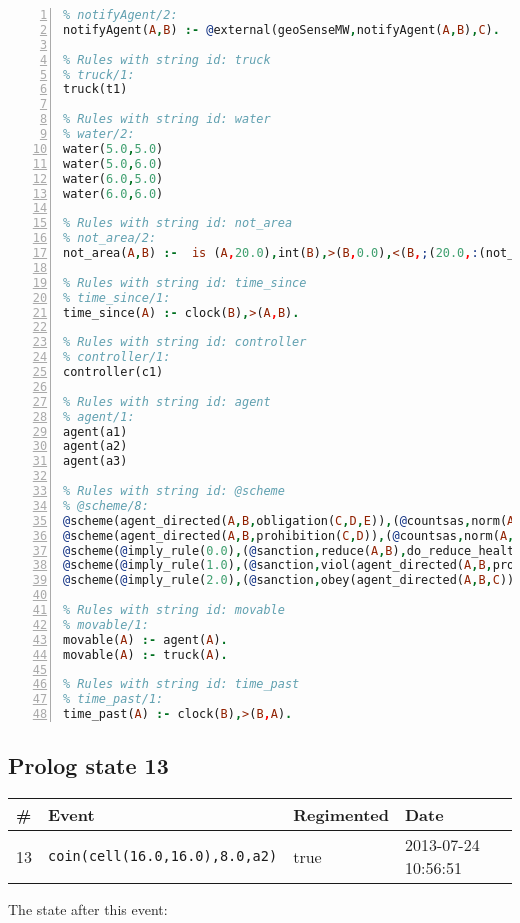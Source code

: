 \documentclass[11pt]{article}\usepackage[utf8]{inputenc}\usepackage{geometry}
\begin{document}
\begin{lstlisting}[language=Prolog, numbers=left]
% Rules with string id: notifyAgent
% notifyAgent/2:
notifyAgent(A,B) :- @external(geoSenseMW,notifyAgent(A,B),C).

% Rules with string id: truck
% truck/1:
truck(t1)

% Rules with string id: water
% water/2:
water(5.0,5.0)
water(5.0,6.0)
water(6.0,5.0)
water(6.0,6.0)

% Rules with string id: not_area
% not_area/2:
not_area(A,B) :-  is (A,20.0),int(B),>(B,0.0),<(B,;(20.0,:(not_area(A,B), is (-(B),20.0)))),int(A),>(A,0.0),<(A,;(20.0,:(area(A,B),-(int(A))))),int(B),>(A,0.0),>(B,0.0),<(A,21.0),<(B,21.0).

% Rules with string id: time_since
% time_since/1:
time_since(A) :- clock(B),>(A,B).

% Rules with string id: controller
% controller/1:
controller(c1)

% Rules with string id: agent
% agent/1:
agent(a1)
agent(a2)
agent(a3)

% Rules with string id: @scheme
% @scheme/8:
@scheme(agent_directed(A,B,obligation(C,D,E)),(@countsas,norm(A,B,F,obligation(C,D,E)),F),false,(listTrue(C)),(time_past(D)),false,[plus(viol(agent_directed(A,B,obligation(C,D,E))))|[]],[plus(obey(agent_directed(A,B,obligation(C,D,E))))|[]])
@scheme(agent_directed(A,B,prohibition(C,D)),(@countsas,norm(A,B,E,prohibition(C,D)),E),(listTrue(C)),false,(false),false,[plus(viol(agent_directed(A,B,prohibition(C,D))))|[]],[plus(obey(agent_directed(A,B,prohibition(C,D))))|[]])
@scheme(@imply_rule(0.0),(@sanction,reduce(A,B),do_reduce_health(A,B),notifyAgent(A,changed(status))),true,false,false,false,[min(reduce(A,B))|[]],[])
@scheme(@imply_rule(1.0),(@sanction,viol(agent_directed(A,B,prohibition(C,D))),do_sanction(D)),true,false,false,false,[min(viol(agent_directed(A,B,prohibition(C,D))))|[]],[])
@scheme(@imply_rule(2.0),(@sanction,obey(agent_directed(A,B,C))),true,false,false,false,[min(obey(agent_directed(A,B,C)))|[]],[])

% Rules with string id: movable
% movable/1:
movable(A) :- agent(A).
movable(A) :- truck(A).

% Rules with string id: time_past
% time_past/1:
time_past(A) :- clock(B),>(B,A).

\end{lstlisting}
\clearpage 
\subsection{Prolog state 13}
\begin{table}[ht]
\centering 
\begin{tabular}{l l l l} 
\textbf{\#} & \textbf{Event} & \textbf{Regimented} & \textbf{Date} \\ [0.5ex] 
\hline
13&\texttt{coin(cell(16.0,16.0),8.0,a2)}&true&2013-07-24 10:56:51\\ [1ex] \hline\end{tabular}
\end{table}
The state after this event:
\end{document}

